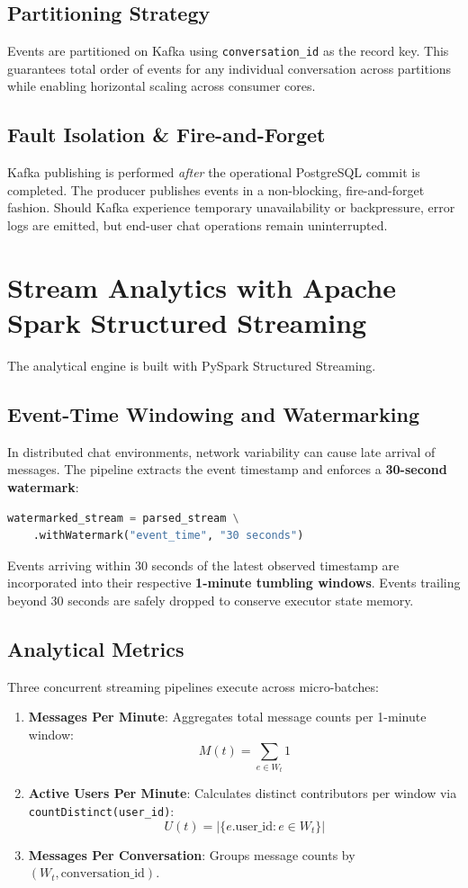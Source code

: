 \documentclass[11pt,a4paper]{article}
\begin{document}
\subsection{Partitioning Strategy}
Events are partitioned on Kafka using \texttt{conversation\_id} as the record key. This guarantees total order of events for any individual conversation across partitions while enabling horizontal scaling across consumer cores.

\subsection{Fault Isolation \& Fire-and-Forget}
Kafka publishing is performed \emph{after} the operational PostgreSQL commit is completed. The producer publishes events in a non-blocking, fire-and-forget fashion. Should Kafka experience temporary unavailability or backpressure, error logs are emitted, but end-user chat operations remain uninterrupted.

\section{Stream Analytics with Apache Spark Structured Streaming}
The analytical engine is built with PySpark Structured Streaming.

\subsection{Event-Time Windowing and Watermarking}
In distributed chat environments, network variability can cause late arrival of messages. The pipeline extracts the event timestamp and enforces a \textbf{30-second watermark}:
\begin{lstlisting}[language=Python]
watermarked_stream = parsed_stream \
    .withWatermark("event_time", "30 seconds")
\end{lstlisting}
Events arriving within 30 seconds of the latest observed timestamp are incorporated into their respective \textbf{1-minute tumbling windows}. Events trailing beyond 30 seconds are safely dropped to conserve executor state memory.

\subsection{Analytical Metrics}
Three concurrent streaming pipelines execute across micro-batches:
\begin{enumerate}
    \item \textbf{Messages Per Minute}: Aggregates total message counts per 1-minute window:
    \[
    M(t) = \sum_{e \in W_t} 1
    \]
    \item \textbf{Active Users Per Minute}: Calculates distinct contributors per window via \texttt{countDistinct(user\_id)}:
    \[
    U(t) = |\{e.\text{user\_id} : e \in W_t\}|
    \]
    \item \textbf{Messages Per Conversation}: Groups message counts by $(W_t, \text{conversation\_id})$.
\end{enumerate}
\end{document}
